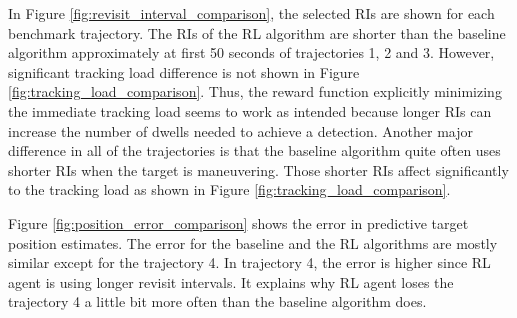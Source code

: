 \documentclass[english, 12pt, a4paper, elec, utf8, a-1b, online]{aaltothesis}
\begin{document}
In Figure \ref{fig:revisit_interval_comparison}, the selected RIs are shown for each benchmark trajectory.
The RIs of the RL algorithm are shorter than the baseline algorithm approximately at first 50 seconds of trajectories 1, 2 and 3.
However, significant tracking load difference is not shown in Figure \ref{fig:tracking_load_comparison}.
Thus, the reward function explicitly minimizing the immediate tracking load seems to work as intended because longer RIs can increase the number of dwells needed to achieve a detection.
Another major difference in all of the trajectories is that the baseline algorithm quite often uses shorter RIs when the target is maneuvering.
Those shorter RIs affect significantly to the tracking load as shown in Figure \ref{fig:tracking_load_comparison}.

Figure \ref{fig:position_error_comparison} shows the error in predictive target position estimates.
The error for the baseline and the RL algorithms are mostly similar except for the trajectory 4.
In trajectory 4, the error is higher since RL agent is using longer revisit intervals.
It explains why RL agent loses the trajectory 4 a little bit more often than the baseline algorithm does.
\end{document}
